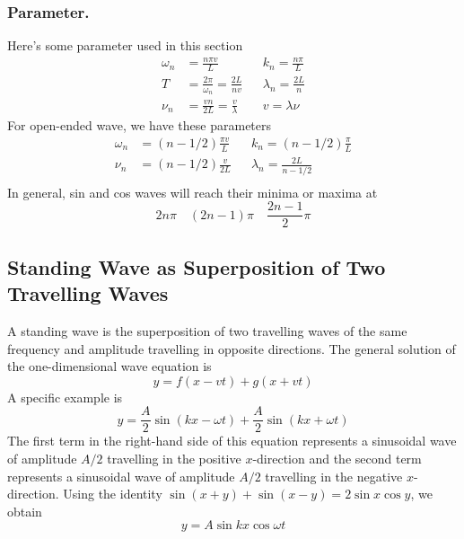\documentclass[../../../main.tex]{subfiles}
\begin{document}
\subsubsection{Parameter.} Here's some parameter used in this section
\begin{align*}
    \omega_n&=\frac{n\pi v}{L}&& k_n=\frac{n\pi}{L}\\
    T&=\frac{2\pi}{\omega_n}=\frac{2L}{nv}&&\lambda_n=\frac{2L}{n}\\
    \nu_n&=\frac{vn}{2L}=\frac{v}{\lambda}&&v=\lambda\nu
\end{align*}
For open-ended wave, we have these parameters 
\begin{align*}
    \omega_n&=(n-1/2)\frac{\pi v}{L}&& k_n=(n-1/2)\frac{\pi}{L}\\
    \nu_n&=(n-1/2)\frac{v}{2L}&&\lambda_n=\frac{2L}{n-1/2}\\
\end{align*}
In general, sin and cos waves will reach their minima or maxima at 
\begin{equation*}
    2n\pi\quad(2n-1)\pi\quad\frac{2n-1}{2}\pi
\end{equation*}

\subsection{Standing Wave as Superposition of Two Travelling Waves}
A standing wave is the superposition of two travelling waves  of the same frequency and amplitude travelling in opposite directions. The general solution of the one-dimensional wave 
equation is
\begin{equation*}
    y = f (x - vt) + g(x + vt)
\end{equation*}
A speciﬁc example is
\begin{equation*}
    y=\frac{A}{2}\sin (kx-\omega t)+\frac{A}{2}\sin (kx+\omega t)
\end{equation*}
The ﬁrst term in the right-hand side of this equation represents a sinusoidal wave of amplitude $A/2$ travelling in the positive $x$-direction and the second term represents a sinusoidal wave of amplitude $A/2$ travelling in the negative $x$-direction. Using the identity $\sin(x + y) + \sin(x - y) = 2 \sin x \cos y$, we obtain
\begin{equation*}
    y=A \sin kx \cos \omega t
\end{equation*}
\end{document}
